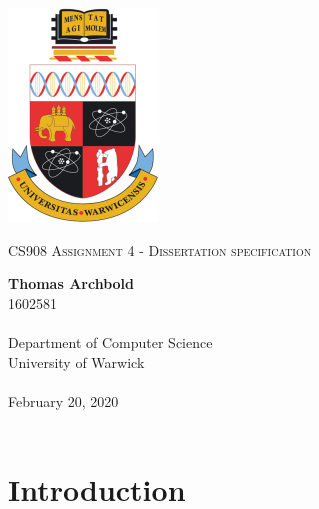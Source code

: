 \documentclass[10pt,a4paper]{article}
\theoremstyle{plain}
\theoremstyle{definition}
\begin{document}
\begin{titlepage}
    \begin{center}

        \vspace*{2cm}
        \includegraphics[width=.25\textwidth]{crest.png}

        \vspace*{1cm}
		{\Large \textsc{CS908 Assignment 4 - Dissertation specification}}

        \vspace*{1cm}
        \textbf{Thomas Archbold} \\
		1602581 \\~\\
        Department of Computer Science \\
        University of Warwick \\~\\

        February 20, 2020 \\~\\

        \vfill

    \end{center}
\end{titlepage}



\section{Introduction}
\end{document}
